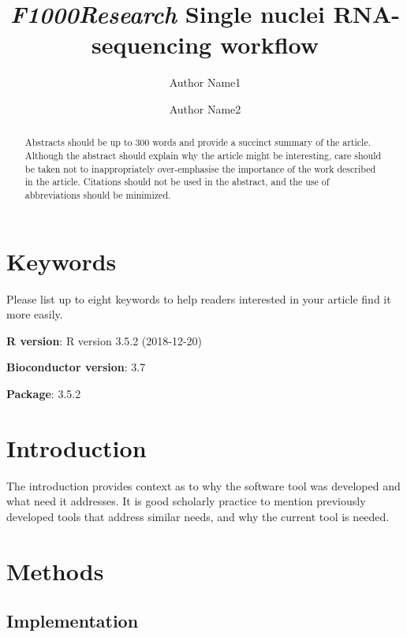 \documentclass[9pt,a4paper,]{extarticle}
\begin{document}
\pagestyle{front}

\title{\emph{F1000Research} Single nuclei RNA-sequencing workflow}

\author[1]{Author Name1}
\author[2]{Author Name2}

\maketitle
\thispagestyle{front}

\begin{abstract}
Abstracts should be up to 300 words and provide a succinct summary of the article. Although the abstract should explain why the article might be interesting, care should be taken not to inappropriately over-emphasise the importance of the work described in the article. Citations should not be used in the abstract, and the use of abbreviations should be minimized.
\end{abstract}

\section*{Keywords}
Please list up to eight keywords to help readers interested in your article find it more easily.


\clearpage
\pagestyle{main}

\textbf{R version}: R version 3.5.2 (2018-12-20)

\textbf{Bioconductor version}: 3.7

\textbf{Package}: 3.5.2

\section{Introduction}\label{introduction}

The introduction provides context as to why the software tool was developed and what need it addresses. It is good scholarly practice to mention previously developed tools that address similar needs, and why the current tool is needed.

\section{Methods}\label{methods}

\subsection{Implementation}\label{implementation}
\end{document}

